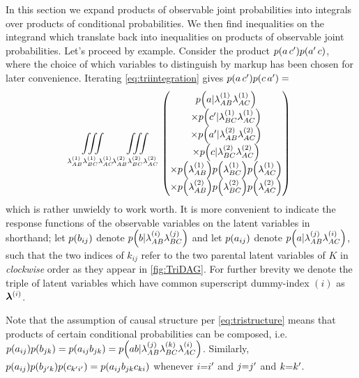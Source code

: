 \begin{EDITING...}
In this section we expand products of observable joint probabilities into integrals over products of conditional probabilities. We then find inequalities on the integrand which translate back into inequalities on products of observable joint probabilities. Let's proceed by example. Consider the product $\p{a\, c'}\p{a'\,c}$, where the choice of which variables to distinguish by markup has been chosen for later convenience. Iterating \cref{eq:triintegration} gives $\p{a\, c'}\p{c\, a'}=$
\begin{align*}
\iiint\limits_{{\lambda_{AB}^{(1)}\lambda_{BC}^{(1)}\lambda_{AC}^{(1)}}}\,\iiint\limits_{{\lambda_{AB}^{(2)}\lambda_{BC}^{(2)}\lambda_{AC}^{(2)}}}\,
\begin{pmatrix}
\p{a|\lambda_{AB}^{(1)}\lambda_{AC}^{(1)}}
\\\times \p{c'|\lambda_{BC}^{(1)}\lambda_{AC}^{(1)}}
\\\times \p{a'|\lambda_{AB}^{(2)}\lambda_{AC}^{(2)}}
\\\times \p{c|\lambda_{BC}^{(2)}\lambda_{AC}^{(2)}}
\\\times \p{\lambda_{AB}^{(1)}}\p{\lambda_{BC}^{(1)}} \p{\lambda_{AC}^{(1)}}
\\\times \p{\lambda_{AB}^{(2)}}\p{\lambda_{BC}^{(2)}} \p{\lambda_{AC}^{(2)}}
\end{pmatrix}
\end{align*}
which is rather unwieldy to work worth. It is more convenient to indicate the response functions of the observable variables on the latent variables in shorthand; let $\p{b_{ij}}$ denote $\p{b|\lambda_{AB}^{(i)}\lambda_{BC}^{(j)}}$ and let $\p{a_{ij}}$ denote $\p{a|\lambda_{AB}^{(j)}\lambda_{AC}^{(i)}}$, such that the two indices of $k_{ij}$ refer to the two parental latent variables of $K$ in \emph{clockwise} order as they appear in \cref{fig:TriDAG}. For further brevity we denote the triple of latent variables which have common superscript dummy-index $(i)$ as $\bm{\lambda}^{(i)}$. 

Note that the assumption of causal structure per \cref{eq:tristructure} means that products of certain conditional probabilities can be composed, i.e. $\p{a_{ij}}\p{b_{jk}}=\p{a_{ij} b_{jk}}=\p{a b|\lambda_{AB}^{(j)}\lambda_{BC}^{(k)}\lambda_{AC}^{(i)}}$. Similarly, $\p{a_{ij}}\p{b_{j'k}}\p{c_{k'i'}}=\p{a_{ij} b_{jk} c_{ki}}$ whenever $i\mathord{=}i'$ and $j\mathord{=}j'$ and $k\mathord{=}k'$.


\end{EDITING...}
